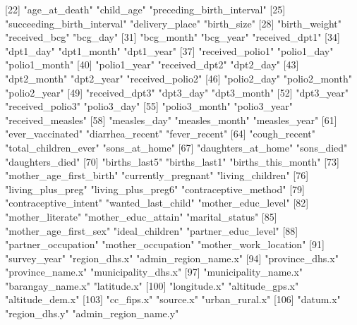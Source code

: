  [22] "age_at_death"              "child_age"                 "preceding_birth_interval" 
 [25] "succeeding_birth_interval" "delivery_place"            "birth_size"               
 [28] "birth_weight"              "received_bcg"              "bcg_day"                  
 [31] "bcg_month"                 "bcg_year"                  "received_dpt1"            
 [34] "dpt1_day"                  "dpt1_month"                "dpt1_year"                
 [37] "received_polio1"           "polio1_day"                "polio1_month"             
 [40] "polio1_year"               "received_dpt2"             "dpt2_day"                 
 [43] "dpt2_month"                "dpt2_year"                 "received_polio2"          
 [46] "polio2_day"                "polio2_month"              "polio2_year"              
 [49] "received_dpt3"             "dpt3_day"                  "dpt3_month"               
 [52] "dpt3_year"                 "received_polio3"           "polio3_day"               
 [55] "polio3_month"              "polio3_year"               "received_measles"         
 [58] "measles_day"               "measles_month"             "measles_year"             
 [61] "ever_vaccinated"           "diarrhea_recent"           "fever_recent"             
 [64] "cough_recent"              "total_children_ever"       "sons_at_home"             
 [67] "daughters_at_home"         "sons_died"                 "daughters_died"           
 [70] "births_last5"              "births_last1"              "births_this_month"        
 [73] "mother_age_first_birth"    "currently_pregnant"        "living_children"          
 [76] "living_plus_preg"          "living_plus_preg6"         "contraceptive_method"     
 [79] "contraceptive_intent"      "wanted_last_child"         "mother_educ_level"        
 [82] "mother_literate"           "mother_educ_attain"        "marital_status"           
 [85] "mother_age_first_sex"      "ideal_children"            "partner_educ_level"       
 [88] "partner_occupation"        "mother_occupation"         "mother_work_location"     
 [91] "survey_year"               "region_dhs.x"              "admin_region_name.x"      
 [94] "province_dhs.x"            "province_name.x"           "municipality_dhs.x"       
 [97] "municipality_name.x"       "barangay_name.x"           "latitude.x"               
[100] "longitude.x"               "altitude_gps.x"            "altitude_dem.x"           
[103] "cc_fips.x"                 "source.x"                  "urban_rural.x"            
[106] "datum.x"                   "region_dhs.y"              "admin_region_name.y"      
